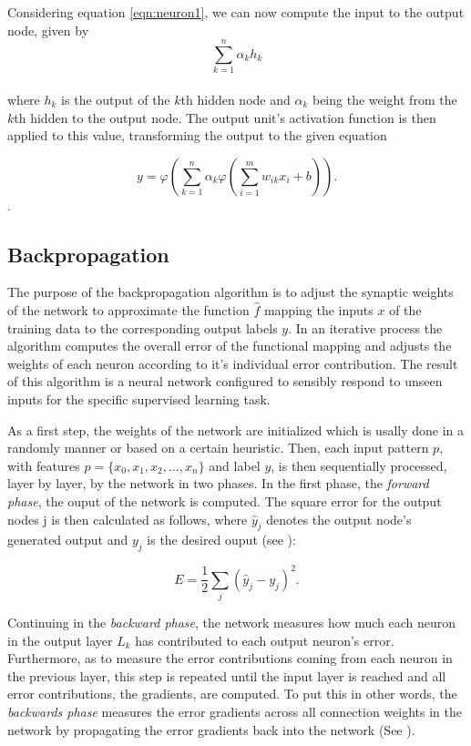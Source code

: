 Considering equation \ref{eqn:neuron1}, we can now compute the input to the output node, given by\\
\begin{equation}
  \sum_{k=1}^{n} \alpha_k h_k
\end{equation}
\\
where $h_k$ is the output of the $k$th hidden node and $\alpha_k$ being the weight from the $k$th hidden to the output node. The output unit's activation function is then applied to this value, transforming the output to the given equation

\begin{equation}
  y = \varphi\left(\sum_{k=1}^{n} \alpha_k \varphi \left(\sum_{i=1}^{m} w_{ik} x_i + b \right)\right).
\end{equation}.

\subsection{Backpropagation}
\label{sec:backprop}
The purpose of the backpropagation algorithm \cite{rumelhart1988learning} is to adjust the synaptic weights of the network to approximate the function $\hat f$ mapping the inputs $x$ of the training data to the corresponding output labels $y$. In an iterative process the algorithm computes the overall error of the functional mapping and adjusts the weights of each neuron according to it's individual error contribution. The result of this algorithm is a neural network configured to sensibly respond to unseen inputs for the specific supervised learning task.

As a first step, the weights of the network are initialized which is usally done in a randomly manner or based on a certain heuristic. Then, each input pattern $p$, with features $p = \{x_0,x_1, x_2, \dots, x_n \}$ and label $y$, is then sequentially processed, layer by layer, by the network in two phases. In the first phase, the \textit{forward phase}, the ouput of the network is computed. The square error for the output nodes j is then calculated as follows, where $\hat{y}_j$ denotes the output node's generated output and $y_j$ is the desired ouput (see \cite{Haykin:1998:NNC:521706}):

\begin{equation}
  E = \frac{1}{2}\sum_{j} (\hat{y}_j - y_j)^2.
\end{equation}

Continuing in the \textit{backward phase}, the network measures how much each neuron in the output layer $L_k$ has contributed to each output neuron's error. Furthermore, as to measure the error contributions coming from each neuron in the previous layer, this step is repeated until the input layer is reached and all error contributions, the gradients, are computed. To put this in other words, the \textit{backwards phase} measures the error gradients across all connection weights in the network by propagating the error gradients back into the network (See \cite{Mitchell:1997:ML:541177}).

